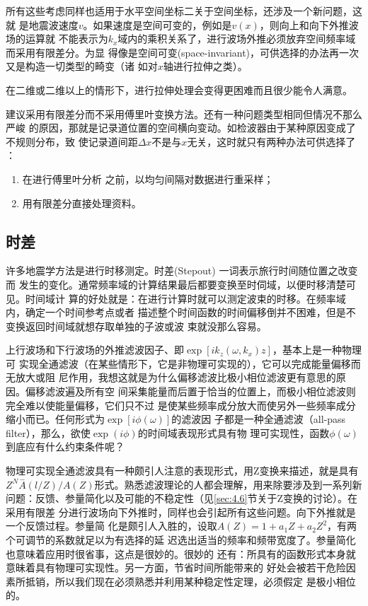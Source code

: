 所有这些考虑同样也适用于水平空间坐标二关于空间坐标，还涉及一个新问题，这就
是地震波速度$v$。如果速度是空间可变的，例如是$v(x)$，则向上和向下外推波场的运算就
不能表示为$k_x$域内的乘积关系了，进行波场外推必须放弃空间频率域而采用有限差分。为显
得像是空间可变(space-invariant)，可供选择的办法再一次又是构造一切类型的畸变（诸
如对$x$轴进行拉伸之类）。

在二维或二维以上的情形下，进行拉伸处理会变得更困难而且很少能令人满意。

建议采用有限差分而不采用傅里叶变换方法。还有一种问题类型相同但情况不那么严峻
的原因，那就是记录道位置的空间横向变动。如检波器由于某种原因变成了不规则分布，致
使记录道间距$\Delta x$不是与$x$无关，这时就只有两种办法可供选择了 ：
\begin{enumerate}
\item 在进行傅里叶分析
之前，以均匀间隔对数据进行重采样；
\item 用有限差分直接处理资料。
\end{enumerate}

\subsection{时差}
许多地震学方法是进行时移测定。时差(Stepout)
一词表示旅行时间随位置之改变而
发生的变化。通常频率域的计算结果最后都要变换至时伺域，以便时移清楚可见。时间域计
算的好处就是：在进行计算时就可以测定波束的时移。在频率域内，确定一个时间参考点或者
描述整个时间函数的时间偏移倒并不困难，但是不变换返回时间域就想存取单独的子波或波
束就没那么容易。

上行波场和下行波场的外推滤波因子、即$\exp[ik_z(\omega,k_x)z]$，基本上是一种物理可
实现全通滤波（在某些情形下，它是非物理可实现的），它可以完成能量偏移而无放大或阻
尼作用，我想这就是为什么偏移滤波比极小相位滤波更有意思的原因。偏移滤波遍及所有空
间采集能量而后置于恰当的位置上，而极小相位滤波则完全难以使能量偏移，它们只不过
是使某些频率成分放大而使另外一些频率成分缩小而已。任何形式为$\exp[i\phi(\omega)]$的滤波因
子都是一种全通滤波（all-pass filter），那么，欲使$\exp (i\phi)$的时间域表现形式具有物
理可实现性，函数$\phi(\omega)$到底应有什么约束条件呢？

物理可实现全通滤波具有一种颇引人注意的表现形式，用Z变换来描述，就是具有
$Z^N\overset{-}{A}(l/Z)/A(Z)$形式。熟悉滤波理论的人都会理解，用来除要涉及到一系列新
问题：反馈、参量简化以及可能的不稳定性（见\ref{sec:4.6}节关于Z变换的讨论）。在采用有限差
分进行波场向下外推时，同样也会引起所有这些问题。向下外推就是一个反馈过程。参量简
化是颇引人入胜的，设取$A(Z)=1+a_1Z+a_2Z^2$，有两个可调节的系数就足以为有选择的延
迟选出适当的频率和频带宽度了。参量简化也意味着应用时很省事，这点是很妙的。很妙的
还有：所具有的函数形式本身就意昧着具有物理可实现性。另一方面，节省时间所能带来的
好处会被若干危险因素所抵销，所以我们现在必须熟悉并利用某种稳定性定理，必须假定
是极小相位的。

